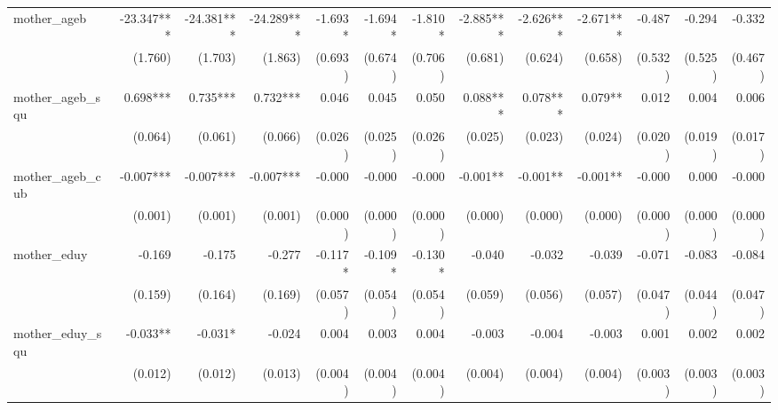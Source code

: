 \begin{tabular}{lrrrrrrrrrrrr}
mother\_ageb                                &   -23.347*** &   -24.381*** &   -24.289*** &      -1.693* &      -1.694* &      -1.810* &    -2.885*** &    -2.626*** &    -2.671*** &       -0.487 &       -0.294 &       -0.332 \\ 
                                            &      (1.760) &      (1.703) &      (1.863) &      (0.693) &      (0.674) &      (0.706) &      (0.681) &      (0.624) &      (0.658) &      (0.532) &      (0.525) &      (0.467) \\ 
mother\_ageb\_squ                           &     0.698*** &     0.735*** &     0.732*** &        0.046 &        0.045 &        0.050 &     0.088*** &     0.078*** &      0.079** &        0.012 &        0.004 &        0.006 \\ 
                                            &      (0.064) &      (0.061) &      (0.066) &      (0.026) &      (0.025) &      (0.026) &      (0.025) &      (0.023) &      (0.024) &      (0.020) &      (0.019) &      (0.017) \\ 
mother\_ageb\_cub                           &    -0.007*** &    -0.007*** &    -0.007*** &       -0.000 &       -0.000 &       -0.000 &     -0.001** &     -0.001** &     -0.001** &       -0.000 &        0.000 &       -0.000 \\ 
                                            &      (0.001) &      (0.001) &      (0.001) &      (0.000) &      (0.000) &      (0.000) &      (0.000) &      (0.000) &      (0.000) &      (0.000) &      (0.000) &      (0.000) \\ 
mother\_eduy                                &       -0.169 &       -0.175 &       -0.277 &      -0.117* &      -0.109* &      -0.130* &       -0.040 &       -0.032 &       -0.039 &       -0.071 &       -0.083 &       -0.084 \\ 
                                            &      (0.159) &      (0.164) &      (0.169) &      (0.057) &      (0.054) &      (0.054) &      (0.059) &      (0.056) &      (0.057) &      (0.047) &      (0.044) &      (0.047) \\ 
mother\_eduy\_squ                           &     -0.033** &      -0.031* &       -0.024 &        0.004 &        0.003 &        0.004 &       -0.003 &       -0.004 &       -0.003 &        0.001 &        0.002 &        0.002 \\ 
                                            &      (0.012) &      (0.012) &      (0.013) &      (0.004) &      (0.004) &      (0.004) &      (0.004) &      (0.004) &      (0.004) &      (0.003) &      (0.003) &      (0.003) \\ 

\end{tabular}
